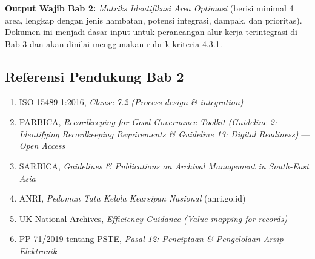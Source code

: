 \documentclass[12pt,a4paper]{report}
\begin{document}
\begin{outputbox}
\textbf{Output Wajib Bab 2:} \textit{Matriks Identifikasi Area Optimasi} (berisi minimal 4 area, lengkap dengan jenis hambatan, potensi integrasi, dampak, dan prioritas). Dokumen ini menjadi dasar input untuk perancangan alur kerja terintegrasi di Bab 3 dan akan dinilai menggunakan rubrik kriteria 4.3.1.
\end{outputbox}

\subsection*{Referensi Pendukung Bab 2}
\begin{enumerate}[leftmargin=*, nosep]
    \item ISO 15489-1:2016, \textit{Clause 7.2 (Process design \& integration)}
    \item PARBICA, \textit{Recordkeeping for Good Governance Toolkit (Guideline 2: Identifying Recordkeeping Requirements \& Guideline 13: Digital Readiness)} --- \textit{Open Access}
    \item SARBICA, \textit{Guidelines \& Publications on Archival Management in South-East Asia}
    \item ANRI, \textit{Pedoman Tata Kelola Kearsipan Nasional} (anri.go.id)
    \item UK National Archives, \textit{Efficiency Guidance (Value mapping for records)}
    \item PP 71/2019 tentang PSTE, \textit{Pasal 12: Penciptaan \& Pengelolaan Arsip Elektronik}
\end{enumerate}
\end{document}

